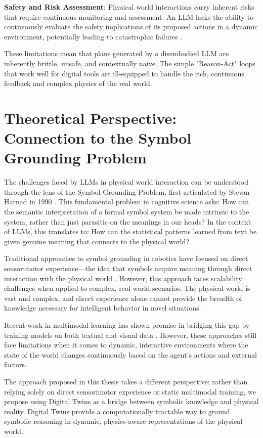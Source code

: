 \textbf{Safety and Risk Assessment}: Physical world interactions carry inherent risks that require continuous monitoring and assessment. An LLM lacks the ability to continuously evaluate the safety implications of its proposed actions in a dynamic environment, potentially leading to catastrophic failures \cite{kenton2021alignment}.

These limitations mean that plans generated by a disembodied LLM are inherently brittle, unsafe, and contextually naive. The simple "Reason-Act" loops that work well for digital tools are ill-equipped to handle the rich, continuous feedback and complex physics of the real world.

\section{Theoretical Perspective: Connection to the Symbol Grounding Problem}

The challenges faced by LLMs in physical world interaction can be understood through the lens of the Symbol Grounding Problem, first articulated by Stevan Harnad in 1990 \cite{harnad1990symbol}. This fundamental problem in cognitive science asks: How can the semantic interpretation of a formal symbol system be made intrinsic to the system, rather than just parasitic on the meanings in our heads? In the context of LLMs, this translates to: How can the statistical patterns learned from text be given genuine meaning that connects to the physical world?

Traditional approaches to symbol grounding in robotics have focused on direct sensorimotor experience—the idea that symbols acquire meaning through direct interaction with the physical world \cite{cangelosi2010integration}. However, this approach faces scalability challenges when applied to complex, real-world scenarios. The physical world is vast and complex, and direct experience alone cannot provide the breadth of knowledge necessary for intelligent behavior in novel situations.

Recent work in multimodal learning has shown promise in bridging this gap by training models on both textual and visual data \cite{radford2021learning, alayrac2022flamingo}. However, these approaches still face limitations when it comes to dynamic, interactive environments where the state of the world changes continuously based on the agent's actions and external factors.

The approach proposed in this thesis takes a different perspective: rather than relying solely on direct sensorimotor experience or static multimodal training, we propose using Digital Twins as a bridge between symbolic knowledge and physical reality. Digital Twins provide a computationally tractable way to ground symbolic reasoning in dynamic, physics-aware representations of the physical world.

